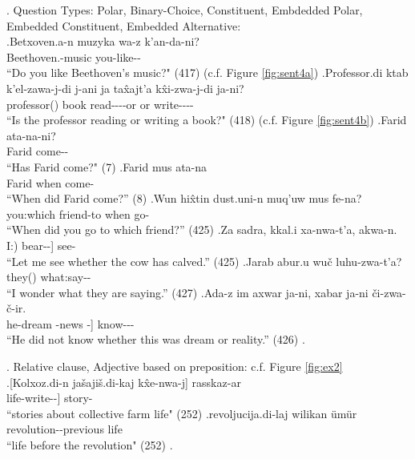 \ex. \label{sent:ex4}Question Types: Polar, Binary-Choice, Constituent, Embdedded Polar, Embedded Constituent, Embedded Alternative:  \\
    \ag.\label{sent:ex4a}Betxoven.a-n muzyka wa-z k'an-da-ni? \\
    Beethoven.\Obl[]-\Gen[] music you-\Dat[] like-\Fut[]-\Q[] \\
    ``Do you like Beethoven's music?" (417) (c.f. Figure \ref{fig:sent4a})
    \bg.\label{sent:ex4b}Professor.di ktab k'el-zawa-j-di j-ani ja ta\^{x}ajt'a k\^{x}i-zwa-j-di ja-ni? \\
    professor(\Erg[]) book read-\Impf[]-\Ptcp[]-\Sbstz[] \Cop[]-\Q[] or or write-\Impf[]-\Ptcp[]-\Sbstz[] \Cop[]-\Q[] \\
    ``Is the professor reading or writing a book?" (418) (c.f. Figure \ref{fig:sent4b})
    \bg.\label{sent:ex4c}Farid ata-na-ni? \\ 
    Farid come-\Aori-\Q \\
    ``Has Farid come?" (7)
    \bg.\label{sent:ex4d}Farid mus ata-na \\
    Farid when come-\Aori \\
    ``When did Farid come?'' (8)
    \bg.\label{sent:ex4e}Wun hi\^{x}tin dust.uni-n muq'uw mus fe-na? \\
    you:\Abs[] which friend-\Gen[] to when go-\Aori[] \\
    ``When did you go to which friend?'' (425)
    \bg.\label{sent:ex4f}Za sadra, kkal.i xa-nwa-t'a, akwa-n. \\
    I:\Erg[] \Pt[] [cow(\Erg[]) bear-\Prf[]-\Cond[]] see-\Hort[] \\
    ``Let me see whether the cow has calved.'' (425)
    \bg.\label{sent:ex4g}Jarab abur.u wu\v{c} luhu-zwa-t'a? \\
    \Pt[] they(\Erg[]) what:\Abs[] say-\Impf[]-\Cond[] \\
    ``I wonder what they are saying.'' (427)
    \bg.\label{sent:ex4h}Ada-z im axwar ja-ni, xabar ja-ni \v{c}i-zwa-\v{c}-ir. \\
    he-\Dat[] [this:\Abs[] dream \Cop[]-\Q[] news \Cop[]-\Q[]] know-\Impf[]-\Neg[]-\Pst[] \\
    ``He did not know whether this was dream or reality.'' (426)
    \z.


\ex. Relative clause, Adjective based on preposition: c.f. Figure \ref{fig:ex2} \\
    \ag.\label{sent:ex2a}[Kolxoz.di-n ja\v{s}aji\v{s}.di-kaj k\^{x}e-nwa-j] rasskaz-ar \\
        [kolkhoz-\Gen[] life-\Sbelc[] write-\Prf[]-\Ptcp[]] story-\Pl[] \\
        ``stories about collective farm life" (252)
    \bg.\label{sent:ex2b}revoljucija.di-laj wilikan \"{u}m\"{u}r \\
        revolution-\Obl[]-\Srelc[] previous life \\
        ``life before the revolution" (252)
    \z.
    
